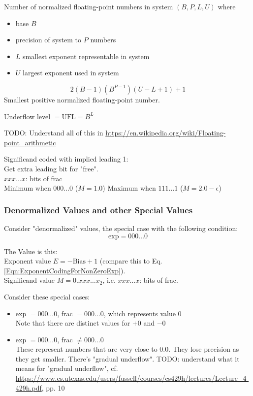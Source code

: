 \documentclass[10pt]{amsart}
\begin{document}
\begin{multicols*}{2}
Number of normalized floating-point numbers in system $(B, P, L, U)$ where 
\begin{itemize}
	\item base $B$
	\item precision of system to $P$ numbers
	\item $L$ smallest exponent representable in system
	\item $U$ largest exponent used in system
\end{itemize}
\begin{equation}
2(B-1)(B^{P-1}) (U - L + 1) + 1
\end{equation}
Smallest positive normalized floating-point number.

Underflow level $= \text{UFL} = B^L$

TODO: Understand all of this in \url{https://en.wikipedia.org/wiki/Floating-point_arithmetic}

Significand coded with implied leading 1: \\
Get extra leading bit for "free". \\
$xxx\dots x$: bits of frac \\
Minimum when $000 \dots 0$ ($M=1.0$)
Maximum when $111 \dots 1$ ($M = 2.0 - \epsilon$)

\subsubsection{Denormalized Values and other Special Values}

Consider "denormalized" values, the special case with the following condition:
\[
\text{exp} = 000\dots 0
\]

The Value is this: \\
Exponent value $E = -\text{Bias} + 1$ (compare this to Eq. \ref{Eqn:ExponentCodingForNonZeroExp}). \\
Significand value $M = 0.xxx\dots x_2$, i.e. $xxx...x$: bits of frac.

Consider these special cases:
\begin{itemize}
	\item exp $= 000\dots 0$, frac $ = 000\dots 0$, which represents value 0 \\
	Note that there are distinct values for $+0$ and $-0$
	\item exp $= 000 \dots 0$, frac $\neq 000\dots 0$ \\
	These represent numbers that are very close to 0.0. They lose precision as they get smaller. There's "gradual underflow". TODO: understand what it means for "gradual underflow", cf. \url{https://www.cs.utexas.edu/users/fussell/courses/cs429h/lectures/Lecture_4-429h.pdf}, pp. 10
\end{itemize}


\end{multicols*}
\end{document}
